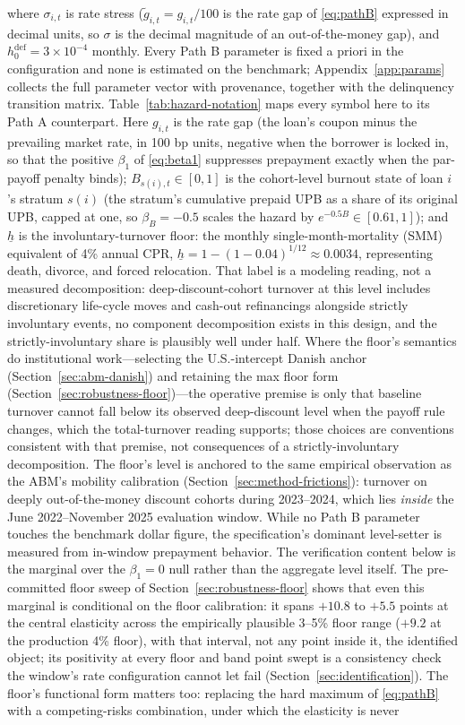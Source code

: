 \documentclass[12pt]{article}
\begin{document}
where $\sigma_{i,t}$ is rate stress ($\tilde g_{i,t} = g_{i,t}/100$ is the rate gap of \eqref{eq:pathB} expressed in decimal units, so $\sigma$ is the decimal magnitude of an out-of-the-money gap), and $h^{\mathrm{def}}_0 = 3\times10^{-4}$ monthly. Every Path B parameter is fixed a priori in the configuration and none is estimated on the benchmark; Appendix~\ref{app:params} collects the full parameter vector with provenance, together with the delinquency transition matrix. Table~\ref{tab:hazard-notation} maps every symbol here to its Path A counterpart. Here $g_{i,t}$ is the rate gap (the loan's coupon minus the prevailing market rate, in 100 bp units, negative when the borrower is locked in, so that the positive $\beta_1$ of \eqref{eq:beta1} suppresses prepayment exactly when the par-payoff penalty binds); $B_{s(i),t} \in [0,1]$ is the cohort-level burnout state of loan $i$'s stratum $s(i)$ (the stratum's cumulative prepaid UPB as a share of its original UPB, capped at one, so $\beta_B = -0.5$ scales the hazard by $e^{-0.5 B} \in [0.61, 1]$); and $\underline{h}$ is the involuntary-turnover floor: the monthly single-month-mortality (SMM) equivalent of 4\% annual CPR, $\underline{h} = 1-(1-0.04)^{1/12} \approx 0.0034$, representing death, divorce, and forced relocation. That label is a modeling reading, not a measured decomposition: deep-discount-cohort turnover at this level includes discretionary life-cycle moves and cash-out refinancings alongside strictly involuntary events, no component decomposition exists in this design, and the strictly-involuntary share is plausibly well under half. Where the floor's semantics do institutional work---selecting the U.S.-intercept Danish anchor (Section~\ref{sec:abm-danish}) and retaining the max floor form (Section~\ref{sec:robustness-floor})---the operative premise is only that baseline turnover cannot fall below its observed deep-discount level when the payoff rule changes, which the total-turnover reading supports; those choices are conventions consistent with that premise, not consequences of a strictly-involuntary decomposition. The floor's level is anchored to the same empirical observation as the ABM's mobility calibration (Section~\ref{sec:method-frictions}): turnover on deeply out-of-the-money discount cohorts during 2023--2024, which lies \emph{inside} the June 2022--November 2025 evaluation window. While no Path B parameter touches the benchmark dollar figure, the specification's dominant level-setter is measured from in-window prepayment behavior. The verification content below is the marginal over the $\beta_1 = 0$ null rather than the aggregate level itself. The pre-committed floor sweep of Section~\ref{sec:robustness-floor} shows that even this marginal is conditional on the floor calibration: it spans $+10.8$ to $+5.5$ points at the central elasticity across the empirically plausible 3--5\% floor range ($+9.2$ at the production 4\% floor), with that interval, not any point inside it, the identified object; its positivity at every floor and band point swept is a consistency check the window's rate configuration cannot let fail (Section~\ref{sec:identification}). The floor's functional form matters too: replacing the hard maximum of \eqref{eq:pathB} with a competing-risks combination, under which the elasticity is never 
\end{document}
